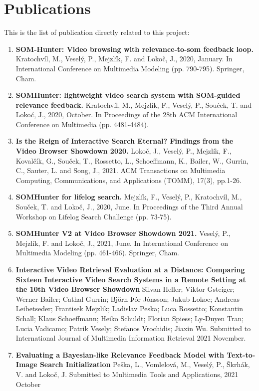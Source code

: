 \pagebreak
\section{Publications}
This is the list of publication directly related to this project:
\begin{enumerate}
	\item \textbf{SOM-Hunter: Video browsing with relevance-to-som feedback loop.} Kratochvíl, M., Veselý, P., Mejzlík, F. and Lokoč, J., 2020, January. In International Conference on Multimedia Modeling (pp. 790-795). Springer, Cham.
	\item \textbf{SOMHunter: lightweight video search system with SOM-guided relevance feedback.} Kratochvíl, M., Mejzlík, F., Veselý, P., Soućek, T. and Lokoć, J., 2020, October. In Proceedings of the 28th ACM International Conference on Multimedia (pp. 4481-4484).
	\item \textbf{Is the Reign of Interactive Search Eternal? Findings from the Video Browser Showdown 2020.} Lokoč, J., Veselý, P., Mejzlík, F., Kovalčík, G., Souček, T., Rossetto, L., Schoeffmann, K., Bailer, W., Gurrin, C., Sauter, L. and Song, J., 2021.  ACM Transactions on Multimedia Computing, Communications, and Applications (TOMM), 17(3), pp.1-26.
	\item \textbf{SOMHunter for lifelog search.} Mejzlík, F., Veselý, P., Kratochvíl, M., Souček, T. and Lokoč, J., 2020, June. In Proceedings of the Third Annual Workshop on Lifelog Search Challenge (pp. 73-75).
	\item \textbf{SOMHunter V2 at Video Browser Showdown 2021.} Veselý, P., Mejzlík, F. and Lokoč, J., 2021, June. In International Conference on Multimedia Modeling (pp. 461-466). Springer, Cham.
	\item \textbf{Interactive Video Retrieval Evaluation at a Distance: Comparing Sixteen Interactive Video Search Systems in a Remote Setting at the 10th Video Browser Showdown} Silvan Heller; Viktor Gsteiger; Werner Bailer; Cathal Gurrin; Björn Þór Jónsson; Jakub Lokoc; Andreas Leibetseder; Frantisek Mejzlik; Ladislav Peska; Luca Rossetto; Konstantin Schall; Klaus Schoeffmann; Heiko Schuldt; Florian Spiess; Ly-Duyen Tran; Lucia Vadicamo; Patrik Vesely; Stefanos Vrochidis; Jiaxin Wu. Submitted to International Journal of Multimedia Information Retrieval 2021 November.
	\item \textbf{Evaluating a Bayesian-like Relevance Feedback Model with Text-to-Image Search Initialization} Peška, L., Vomlelová, M., Veselý, P., Škrhák, V. and Lokoč, J. Submitted to Multimedia Tools and Applications, 2021 October

\end{enumerate}
